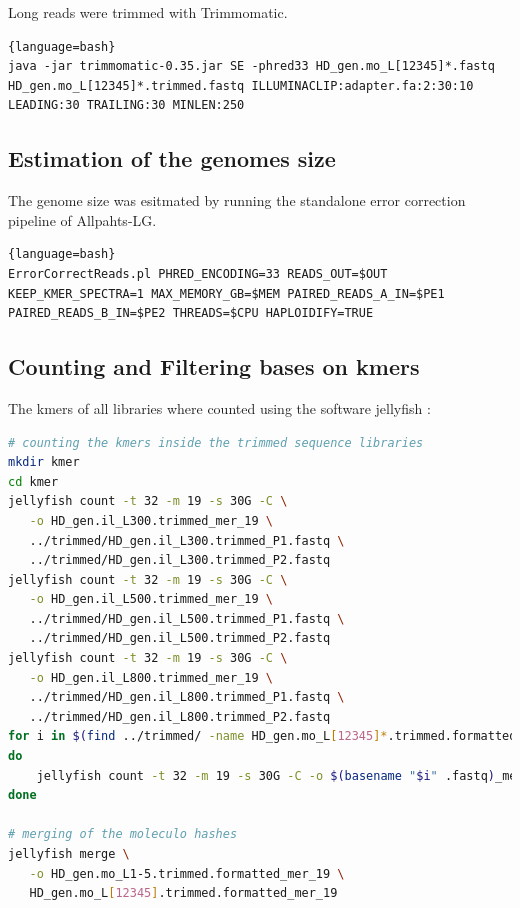 \documentclass[12pt,a4paper]{scrartcl}
\begin{document}
Long reads were trimmed with Trimmomatic.

\begin{lstlisting}{language=bash}
java -jar trimmomatic-0.35.jar SE -phred33 HD_gen.mo_L[12345]*.fastq HD_gen.mo_L[12345]*.trimmed.fastq ILLUMINACLIP:adapter.fa:2:30:10 LEADING:30 TRAILING:30 MINLEN:250
\end{lstlisting}

\subsection*{Estimation of the genomes size}

The genome size was esitmated by running the standalone error correction pipeline of Allpahts-LG.

\begin{lstlisting}{language=bash}
ErrorCorrectReads.pl PHRED_ENCODING=33 READS_OUT=$OUT KEEP_KMER_SPECTRA=1 MAX_MEMORY_GB=$MEM PAIRED_READS_A_IN=$PE1 PAIRED_READS_B_IN=$PE2 THREADS=$CPU HAPLOIDIFY=TRUE
\end{lstlisting}

\subsection*{Counting and Filtering bases on kmers}

The kmers of all libraries where counted using the software jellyfish \parencite{Marcais2011}:

\begin{lstlisting}[language=bash]
# counting the kmers inside the trimmed sequence libraries
mkdir kmer
cd kmer
jellyfish count -t 32 -m 19 -s 30G -C \
   -o HD_gen.il_L300.trimmed_mer_19 \
   ../trimmed/HD_gen.il_L300.trimmed_P1.fastq \
   ../trimmed/HD_gen.il_L300.trimmed_P2.fastq
jellyfish count -t 32 -m 19 -s 30G -C \
   -o HD_gen.il_L500.trimmed_mer_19 \
   ../trimmed/HD_gen.il_L500.trimmed_P1.fastq \
   ../trimmed/HD_gen.il_L500.trimmed_P2.fastq
jellyfish count -t 32 -m 19 -s 30G -C \
   -o HD_gen.il_L800.trimmed_mer_19 \
   ../trimmed/HD_gen.il_L800.trimmed_P1.fastq \
   ../trimmed/HD_gen.il_L800.trimmed_P2.fastq
for i in $(find ../trimmed/ -name HD_gen.mo_L[12345]*.trimmed.formatted.fastq)
do
    jellyfish count -t 32 -m 19 -s 30G -C -o $(basename "$i" .fastq)_mer_19 "$i"
done

# merging of the moleculo hashes
jellyfish merge \
   -o HD_gen.mo_L1-5.trimmed.formatted_mer_19 \
   HD_gen.mo_L[12345].trimmed.formatted_mer_19
\end{lstlisting}
\end{document}
